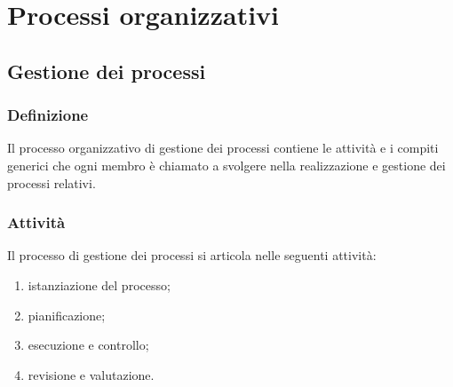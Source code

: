 \chapter{Processi organizzativi}

\section{Gestione dei processi} \label{sec:gestionepro}
\subsection{Definizione}
Il processo organizzativo di gestione dei processi contiene le attività e i compiti generici che ogni membro è chiamato a svolgere nella realizzazione e gestione dei processi relativi.
\subsection{Attività}
Il processo di gestione dei processi si articola nelle seguenti attività:
\begin{enumerate}
    \item istanziazione del processo;
    \item pianificazione;
    \item esecuzione e controllo;
    \item revisione e valutazione.
\end{enumerate}
